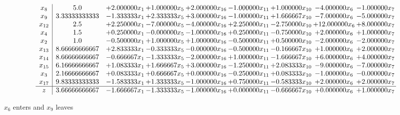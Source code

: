 \documentclass[10pt]{article}
\begin{document}
 \[\begin{array}{c| c c@{\hskip 2pt} c@{\hskip 2pt} c@{\hskip 2pt} c@{\hskip 2pt} c@{\hskip 2pt} c@{\hskip 2pt} c@{\hskip 2pt} }
 x_{8}   &  5.0 & + 2.000000 x_{1} & + 1.000000 x_{5} & + 2.000000 x_{16} & -1.000000 x_{11} & + 1.000000 x_{10} & -4.000000 x_{6} & -1.000000 x_{7}\\
 x_{9}   &  3.33333333333 & -1.333333 x_{1} & + 2.333333 x_{5} & + 3.000000 x_{16} & -1.000000 x_{11} & + 1.666667 x_{10} & -7.000000 x_{6} & -5.000000 x_{7}\\
 x_{12}   &  2.5 & + 2.250000 x_{1} & -7.000000 x_{5} & -4.000000 x_{16} & + 2.250000 x_{11} & -2.750000 x_{10} & + 12.000000 x_{6} & + 8.000000 x_{7}\\
 x_{4}   &  1.5 & + 0.250000 x_{1} & -0.000000 x_{5} & -1.000000 x_{16} & + 0.250000 x_{11} & -0.750000 x_{10} & + 2.000000 x_{6} & + 1.000000 x_{7}\\
 x_{2}   &  1.0 & -0.500000 x_{1} & + 1.000000 x_{5} & + 1.000000 x_{16} & -0.500000 x_{11} & + 0.500000 x_{10} & -2.000000 x_{6} & -2.000000 x_{7}\\
 x_{13}   &  8.66666666667 & + 2.833333 x_{1} & -0.333333 x_{5} & -0.000000 x_{16} & -0.500000 x_{11} & -0.166667 x_{10} & + 1.000000 x_{6} & + 2.000000 x_{7}\\
 x_{14}   &  8.66666666667 & -0.666667 x_{1} & -1.333333 x_{5} & -2.000000 x_{16} & + 1.000000 x_{11} & -1.666667 x_{10} & + 6.000000 x_{6} & + 4.000000 x_{7}\\
 x_{15}   &  6.16666666667 & + 1.083333 x_{1} & + 1.666667 x_{5} & + 3.000000 x_{16} & -1.250000 x_{11} & + 2.083333 x_{10} & -9.000000 x_{6} & -7.000000 x_{7}\\
 x_{3}   &  2.16666666667 & + 0.083333 x_{1} & + 0.666667 x_{5} & + 0.000000 x_{16} & -0.250000 x_{11} & + 0.083333 x_{10} & -1.000000 x_{6} & -0.000000 x_{7}\\
 x_{17}   &  9.83333333333 & -1.583333 x_{1} & + 1.333333 x_{5} & -1.000000 x_{16} & + 0.750000 x_{11} & -0.583333 x_{10} & + 2.000000 x_{6} & + 2.000000 x_{7}\\
\hline
z    &  3.66666666667 & -1.666667 x_{1} & -1.333333 x_{5} & -1.000000 x_{16} & + 0.000000 x_{11} & -0.666667 x_{10} & + 0.000000 x_{6} & + 1.000000 x_{7}\\
\end{array}\]


 $ x_{6} $ enters and $ x_{9} $ leaves 
\end{document}
